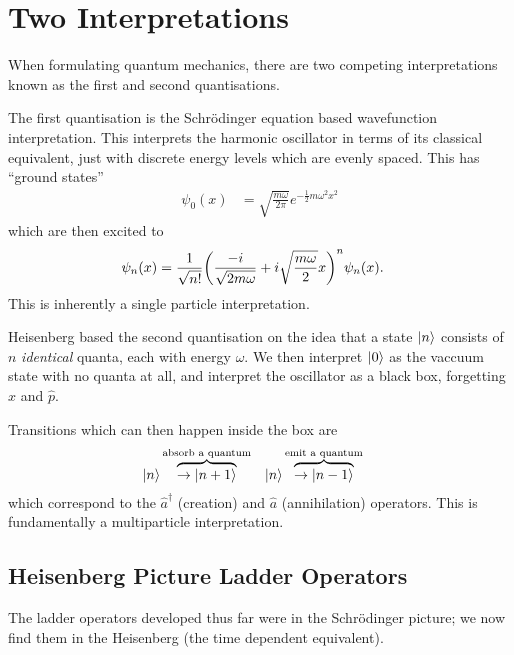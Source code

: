 \documentclass[notes.tex]{subfiles}
\begin{document}
\section{Two Interpretations}
When formulating quantum mechanics, there are two competing interpretations known as the first and second quantisations.

The first quantisation is the Schr\"odinger equation based wavefunction interpretation. This interprets the harmonic oscillator in terms of its classical equivalent, just with discrete energy levels which are evenly spaced. 
This has ``ground states'' 
\begin{align*}
    \psi_0(x) &= \sqrt{\frac{m\omega}{2\pi}} e^{-\frac{1}{2}m\omega^2x^2}
\end{align*}
which are then excited to
\begin{align*}
    \psi_n(x) &= \frac{1}{\sqrt{n!}} \qty(\frac{-i}{\sqrt{2m\omega}} + i\sqrt{\frac{m\omega}{2}}x)^n \psi_n(x).
\end{align*}
This is inherently a single particle interpretation.

Heisenberg based the second quantisation on the idea that a state $\ket{n}$ consists of $n$ \emph{identical} quanta, each with energy $\omega$.
We then interpret $\ket{0}$ as the vaccuum state with no quanta at all, and interpret the oscillator as a black box, forgetting $\hat{x}$ and $\hat{p}$.

Transitions which can then happen inside the box are 
\begin{align*}
    \ket{n}&\overbrace{\to\ket{n+1}}^{\text{absorb a quantum}}&\ket{n}&\overbrace{\to\ket{n-1}}^\text{emit a quantum}
\end{align*}
which correspond to the $\hat{a}^\dagger$ (creation) and $\hat{a}$ (annihilation) operators. This is fundamentally a multiparticle interpretation.

\subsection{Heisenberg Picture Ladder Operators}
The ladder operators developed thus far were in the Schr\"odinger picture; we now find them in the Heisenberg (\ie the time dependent equivalent). 
\end{document}
